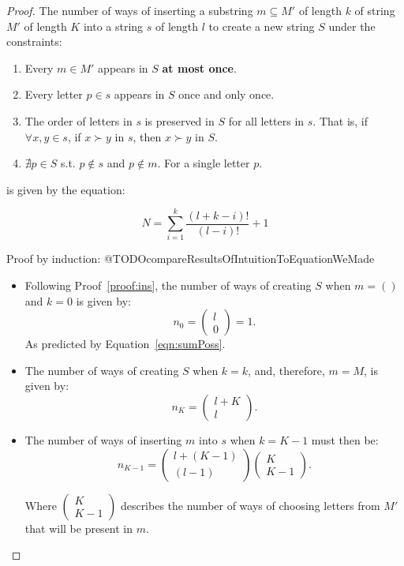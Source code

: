 \documentclass{article}
\newtheorem{proof}{Proof}
\begin{document}
\begin{proof}
The number of ways of inserting a substring $m\subseteq M'$ of length $k$ of string $M'$ of length $K$ into a string $s$ of length $l$ to create a new string $S$ under the constraints:
\begin{enumerate}
\item Every $m \in M'$ appears in $S$ \textbf{at most once}.
\item Every letter $p\in s$ appears in $S$ once and only once.
\item The order of letters in $s$ is preserved in $S$ for all letters in $s$. That is, if $\forall x, y \in s$, if $x \succ y$ in $s$, then $x \succ y$ in $S$.
\item $\nexists p \in S$ s.t. $p \not\in s$ and $p \not\in m$. For a single letter $p$.
\end{enumerate}


is given by the equation:

\begin{equation}\label{eqn:sumPoss}
N = \sum^{k}_{i=1}\frac{(l+k-i)!}{(l-i)!}+1
\end{equation}


Proof by induction:
@TODOcompareResultsOfIntuitionToEquationWeMade
\begin{itemize}
\item Following Proof~\ref{proof:ins}, the number of ways of creating $S$ when $m=()$ and $k=0$ is given by: 
\[
n_0 =\begin{pmatrix} l \\ 0 \end{pmatrix} = 1.
\]
As predicted by Equation~\ref{eqn:sumPoss}.

\item The number of ways of creating $S$ when $k=k$, and, therefore, $m=M$, is given by: 
\[
n_K =\begin{pmatrix} l + K \\ l \end{pmatrix}.
\]

\item The number of ways of inserting $m$ into $s$ when $k=K-1$ must then be:
\[
n_{K-1} =\begin{pmatrix} l + (K-1) \\ (l-1) \end{pmatrix} \begin{pmatrix} K \\ K-1 \end{pmatrix}.
\]

Where $\begin{pmatrix} K \\ K-1 \end{pmatrix}$ describes the number of ways of choosing letters from $M'$ that will be present in $m$.
\end{itemize}
\end{proof}
\end{document}
